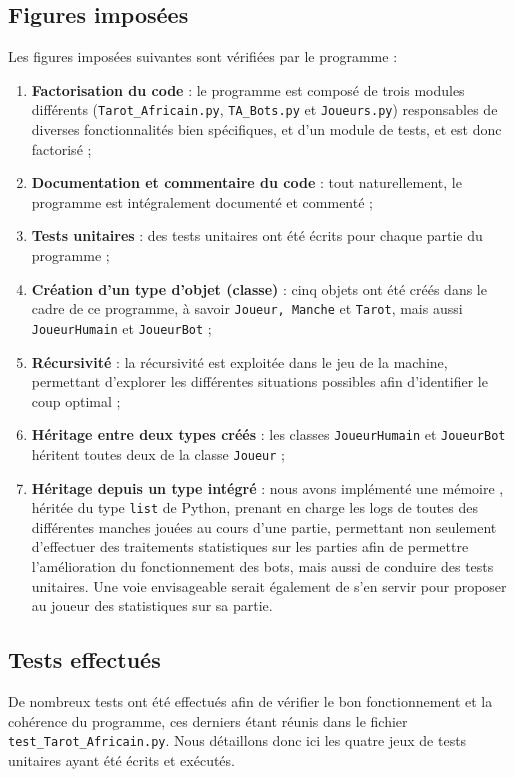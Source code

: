    \subsection{Figures imposées}\label{subsec:figures-imposées}
      Les figures imposées suivantes sont vérifiées par le programme :
      \begin{enumerate}
         \item \textbf{Factorisation du code} : le programme est composé de trois modules différents (\texttt{Tarot\_Africain.py}, \texttt{TA\_Bots.py} et \texttt{Joueurs.py}) responsables de diverses fonctionnalités bien spécifiques, et d'un module de tests, et est donc factorisé ;
         \item \textbf{Documentation et commentaire du code} : tout naturellement, le programme est intégralement documenté et commenté ;
         \item \textbf{Tests unitaires} : des tests unitaires ont été écrits pour chaque partie du programme ;
         \item \textbf{Création d'un type d'objet (classe)} : cinq objets ont été créés dans le cadre de ce programme, à savoir \texttt{Joueur, Manche} et \texttt{Tarot}, mais aussi \texttt{JoueurHumain} et \texttt{JoueurBot} ;
         \item \textbf{Récursivité} : la récursivité est exploitée dans le jeu de la machine, permettant d'explorer les différentes situations possibles afin d'identifier le coup optimal ;
         \item \textbf{Héritage entre deux types créés} : les classes \texttt{JoueurHumain} et \texttt{JoueurBot} héritent toutes deux de la classe \texttt{Joueur} ;
         \item \textbf{Héritage depuis un type intégré} : nous avons implémenté une \og mémoire \fg{}, héritée du type \texttt{list} de Python, prenant en charge les logs de toutes des différentes manches jouées au cours d'une partie, permettant non seulement d'effectuer des traitements statistiques sur les parties afin de permettre l'amélioration du fonctionnement des bots, mais aussi de conduire des tests unitaires.
         Une voie envisageable serait également de s'en servir pour proposer au joueur des statistiques sur sa partie.
      \end{enumerate}

   \subsection{Tests effectués}\label{subsec:tests-effectués}
      De nombreux tests ont été effectués afin de vérifier le bon fonctionnement et la cohérence du programme, ces derniers étant réunis dans le fichier \texttt{test\_Tarot\_Africain.py}.
      Nous détaillons donc ici les quatre jeux de tests unitaires ayant été écrits et exécutés.

